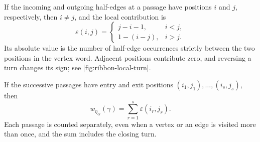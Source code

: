 \documentclass[11pt]{amsart}
\theoremstyle{definition}
\theoremstyle{plain}
\theoremstyle{definition}
\theoremstyle{definition}
\begin{document}
If the incoming and outgoing half-edges at a passage have
positions $i$ and $j$, respectively, then $i\neq j$, and the
local contribution is
\begin{equation}
\label{eq:ribbon-local-turn}
 \varepsilon(i,j)=
 \begin{cases}
  j-i-1,&i<j,\\
  1-(i-j),&i>j.
 \end{cases}
\end{equation}
Its absolute value is the number of half-edge occurrences strictly
between the two positions in the vertex word.  Adjacent positions
contribute zero, and reversing a turn changes its sign; see
\cref{fig:ribbon-local-turn}.

If the successive passages have entry and exit positions
$(i_1,j_1),\ldots,(i_s,j_s)$, then
\begin{equation}
\label{eq:ribbon-winding-sum}
  w_{\eta_G}(\gamma)=\sum_{r=1}^{s}\varepsilon(i_r,j_r).
\end{equation}
Each passage is counted separately, even when a vertex or an edge
is visited more than once, and the sum includes the closing turn.
\end{document}
